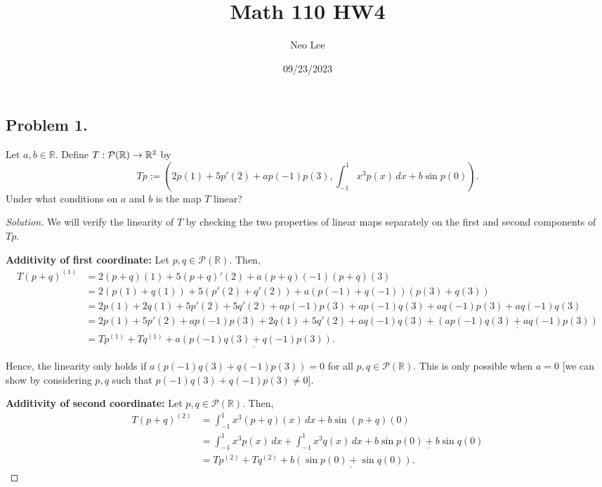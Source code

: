 \documentclass{article}
\title{Math 110 HW4}
\author{Neo Lee}
\date{09/23/2023}
\begin{document}
 

\maketitle 

\subsection*{Problem 1.}
Let $a, b\in \mathbb{R}$. Define $T: {\cal P}(\mathbb{R}) \to \mathbb{R}^2$ by
$$ Tp := (2 p(1) + 5 p'(2) +a p(-1) p(3), \int_{-1}^1 x^3 p(x) \, dx + b \sin p(0)). $$
Under what conditions on $a$ and $b$ is the map $T$ linear?

\begin{proof}[Solution]
    We will verify the linearity of $T$ by checking the two properties of linear maps separately on 
    the first and second components of $Tp$.

    \textbf{Additivity of first coordinate:} Let $p, q \in \mathcal{P}(\mathbb{R})$. Then,
    \begin{align*}
        T(p+q)^{(1)} & = 2(p+q)(1) + 5(p+q)'(2) + a(p+q)(-1)(p+q)(3) \\
        & = 2(p(1) + q(1)) + 5(p'(2) + q'(2)) + a(p(-1)+q(-1))(p(3)+q(3)) \\
        & = 2p(1) + 2q(1) + 5p'(2) + 5q'(2) + ap(-1)p(3) + ap(-1)q(3) + aq(-1)p(3) + aq(-1)q(3) \\
        & = 2p(1) + 5p'(2) + ap(-1)p(3) + 2q(1) + 5q'(2) + aq(-1)q(3) + \underline{\left(ap(-1)q(3) + aq(-1)p(3)\right)} \\
        & = Tp^{(1)} + Tq^{(1)} + \underline{a\left(p(-1)q(3) + q(-1)p(3)\right)}.
    \end{align*}

    Hence, the linearity only holds if $a(p(-1)q(3) + q(-1)p(3)) = 0$ for all 
    $p, q \in \mathcal{P}(\mathbb{R})$. This is only possible when $a = 0$ [we can show by 
    considering $p,q$ such that $p(-1)q(3) + q(-1)p(3)\neq 0$].

    \textbf{Additivity of second coordinate:} Let $p, q \in \mathcal{P}(\mathbb{R})$. Then,
    \begin{align*}
        T(p+q)^{(2)} & = \int_{-1}^1 x^3 (p+q)(x) \, dx + b \sin (p+q)(0) \\
        & = \int_{-1}^1 x^3 p(x) \, dx + \int_{-1}^1 x^3 q(x) \, dx + \underline{b \sin p(0) + b \sin q(0)} \\
        & = Tp^{(2)} + Tq^{(2)} + \underline{b \left(\sin p(0) + \sin q(0)\right)}.
    \end{align*}


\end{proof}
\end{document}
